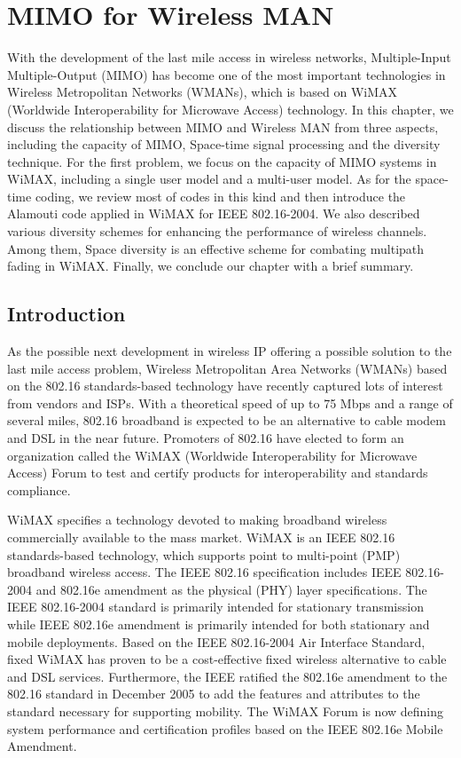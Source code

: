 \chapter{MIMO for Wireless MAN}
\author{Xiaopeng Fan, Steven Y. Lai, Yuan Zheng, and Jiannong Cao\\
Hong Kong Polytechnic University}

With the development of the last mile access in wireless networks,
Multiple-Input Multiple-Output (MIMO) has become one of the most
important technologies in Wireless Metropolitan Networks (WMANs),
which is based on WiMAX (Worldwide Interoperability for Microwave
Access) technology.  In this chapter, we discuss the relationship
between MIMO and Wireless MAN from three aspects, including the
capacity of MIMO, Space-time signal processing and the diversity
technique. For the first problem, we focus on the capacity of MIMO
systems in WiMAX, including a single user model and a multi-user
model. As for the space-time coding, we review most of codes in this
kind and then introduce the Alamouti code applied in WiMAX for IEEE
802.16-2004. We also described various diversity schemes for
enhancing the performance of wireless channels. Among them, Space
diversity is an effective scheme for combating multipath fading in
WiMAX. Finally, we conclude our chapter with a brief summary.

\section{Introduction}
As the possible next development in wireless IP offering a possible
solution to the last mile access problem, Wireless Metropolitan Area
Networks (WMANs) based on the 802.16 standards-based technology
\cite{6} have recently captured lots of interest from vendors and
ISPs. With a theoretical speed of up to 75 Mbps and a range of
several miles, 802.16 broadband is expected to be an alternative to
cable modem and DSL in the near future. Promoters of 802.16 have
elected to form an organization called the WiMAX (Worldwide
Interoperability for Microwave Access) Forum \cite{7} to test and
certify products for interoperability and standards compliance.

WiMAX specifies a technology devoted to making broadband wireless
commercially available to the mass market. WiMAX is an IEEE 802.16
standards-based technology, which supports point to multi-point
(PMP) broadband wireless access. The IEEE 802.16 specification
includes IEEE 802.16-2004 \cite{31} and 802.16e amendment \cite{6}
as the physical (PHY) layer specifications. The IEEE 802.16-2004
standard is primarily intended for stationary transmission while
IEEE 802.16e amendment is primarily intended for both stationary and
mobile deployments. Based on the IEEE 802.16-2004 Air Interface
Standard, fixed WiMAX has proven to be a cost-effective fixed
wireless alternative to cable and DSL services. Furthermore, the
IEEE ratified the 802.16e amendment \cite{6} to the 802.16 standard
in December 2005 to add the features and attributes to the standard
necessary for supporting mobility. The WiMAX Forum is now defining
system performance and certification profiles based on the IEEE
802.16e Mobile Amendment.

